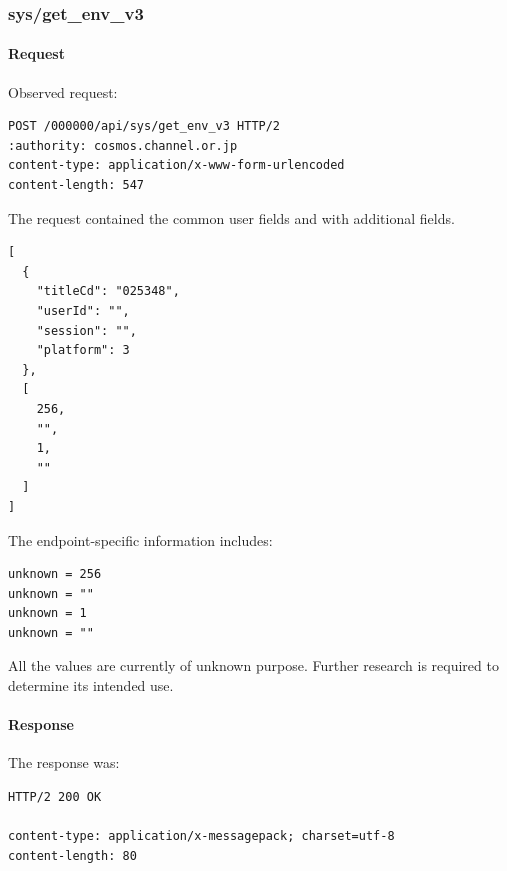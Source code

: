 \subsubsection{sys/get\_env\_v3}
\label{subsec:api_sys_get_env_v3}

\paragraph{Request}

Observed request:

\begin{lstlisting}
POST /000000/api/sys/get_env_v3 HTTP/2
:authority: cosmos.channel.or.jp
content-type: application/x-www-form-urlencoded
content-length: 547
\end{lstlisting}

The request contained the common user fields and with additional fields.

\begin{lstlisting}
[
  {
    "titleCd": "025348",
    "userId": "",
    "session": "",
    "platform": 3
  },
  [
    256,
    "",
    1,
    ""
  ]
]
\end{lstlisting}

The endpoint-specific information includes:

\begin{lstlisting}
unknown = 256
unknown = ""
unknown = 1
unknown = ""
\end{lstlisting}

\begin{tcolorbox}[colback=yellow!10,colframe=orange!80!black,title=Warning]
All the values are currently of unknown purpose.
Further research is required to determine its intended use.
\end{tcolorbox}

\newpage

\paragraph{Response}

The response was:

\begin{lstlisting}
HTTP/2 200 OK

content-type: application/x-messagepack; charset=utf-8
content-length: 80
\end{lstlisting}

